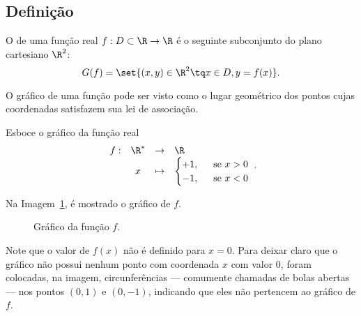 \subsection{Definição}

\begin{definition}
    O  de uma função real $f : D \subset \R \to \R$ é o seguinte subconjunto do plano
cartesiano $\R^2$: $$G(f) = \set{(x,y) \in \R^2 \tq x \in D , y =
f(x)}.$$
\end{definition}

\begin{remark}
    O gráfico de uma função pode ser visto como o lugar geométrico
dos pontos cujas coordenadas satisfazem sua lei de associação.
\end{remark}

\begin{example}
    Esboce o gráfico da função real
    $$\begin{array}{cccl}
    f : & \R^\ast & \to     & \R \\
        &  x & \mapsto & \begin{cases}
                            +1,  &  \ \text{ se } x >0 \\
                            -1, &  \ \text{ se } x <0
                            \end{cases}
    \end{array}.$$
\end{example}

\begin{solution}
    Na Imagem~\ref{img:grafico-funcao-zeroum}, é mostrado o gráfico de $f$.

    \begin{figure}[ht]
    \centering
    \caption{Gráfico da função $f$.}
    \label{img:grafico-funcao-zeroum}
    \end{figure}

    Note que o valor de $f(x)$ não é definido para $x=0$.
    Para deixar claro que o gráfico não possui nenhum ponto com coordenada $x$ com valor $0$, foram colocadas, na imagem, circunferências --- comumente chamadas de bolas abertas --- nos pontos $(0,1)$ e $(0,-1)$, indicando que eles não pertencem ao gráfico de $f$.
\end{solution}